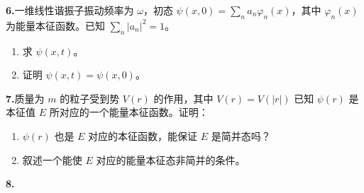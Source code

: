 \textbf{6.}一维线性谐振子振动频率为 $\omega$，初态 $\psi(x, 0) = \sum\limits_n a_n \varphi_n(x)$，其中 $\varphi_n(x)$ 为能量本征函数。已知 $\sum\limits_n |a_n|^2 = 1$。
\begin{enumerate}
    \item 求 $\psi(x, t)$。
    \item 证明 $\psi(x, t) = \psi(x, 0) $。
\end{enumerate}

\textbf{7.}质量为 $m$ 的粒子受到势 $V(r)$ 的作用，其中 $V(r) = V(|r|)$ 已知 $\psi(r)$ 是本征值 $E$ 所对应的一个能量本征函数。证明：
\begin{enumerate}
    \item  $\psi(r)$ 也是 $E$ 对应的本征函数，能保证 $E$ 是简并态吗？
    \item  叙述一个能使 $E$ 对应的能量本征态非简并的条件。
\end{enumerate}

\textbf{8.}